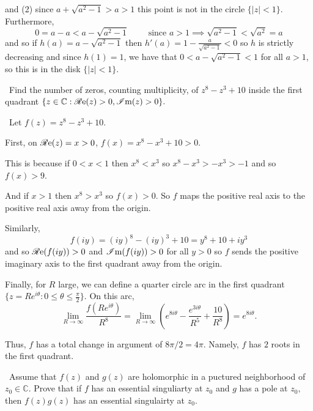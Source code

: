 \documentclass[12pt]{Qual}
\begin{document}
\begin{solution}
and (2) since $a+\sqrt{a^2-1}>a>1$ this point is not in the circle $\{|z|<1\}$. Furthermore, $$0=a-a<a-\sqrt{a^2-1}\qquad\text{ since }a>1\implies \sqrt{a^2-1}<\sqrt{a^2}=a$$ and so if $h(a)=a-\sqrt{a^2-1}$ then $h'(a)=1-\frac{a}{\sqrt{a^2-1}}<0$ so $h$ is strictly decreasing and since $h(1)=1$, we have that $0<a-\sqrt{a^2-1}<1$ for all $a>1$, so this is in the disk $\{|z|<1\}.$

\end{solution}
\newpage



\begin{problem} $\,$
Find the number of zeros, counting multiplicity, of $z^8-z^3+10$ inside the first quadrant $\{z\in\mathbb{C}:\mathscr{R}\text{e}(z)>0,\mathscr{I}\text{m}(z)>0\}.$
\end{problem}

\begin{solution}$\,$
Let $f(z)=z^8-z^3+10$.

First, on $\mathscr{R}\text{e}(z)=x>0$, $f(x)=x^8-x^3+10>0$.

This is because if $0<x<1$ then $x^8<x^3$ so $x^8-x^3>-x^3>-1$ and so $f(x)>9$.

And if $x>1$ then $x^8>x^3$ so $f(x)>0$. So $f$ maps the positive real axis to the positive real axis away from the origin.

Similarly, $$f(iy)=(iy)^8-(iy)^3+10=y^8+10+iy^3$$ and so $\mathscr{R}\text{e}(f(iy))>0$ and $\mathscr{I}\text{m}(f(iy))>0$ for all $y>0$ so $f$ sends the positive imaginary axis to the first quadrant away from the origin.

Finally, for $R$ large, we can define a quarter circle arc in the first quadrant $\{z=Re^{i\theta}:0\le\theta\le\frac{\pi}{2}\}$. On this arc, $$\lim_{R\to\infty}\frac{f(Re^{i\theta})}{R^8}=\lim_{R\to\infty}\left(e^{8i\theta}-\frac{e^{3i\theta}}{R^5}+\frac{10}{R^8}\right)=e^{8i\theta}.$$

Thus, $f$ has a total change in argument of $8\pi/2=4\pi.$ Namely, $f$ has $2$ roots in the first quadrant.
\end{solution}
\newpage




\begin{problem} $\,$
Assume that $f(z)$ and $g(z)$ are holomorphic in a puctured neighborhood of $z_0\in\mathbb{C}$. Prove that if $f$ has an essential singuliarty at $z_0$ and $g$ has a pole at $z_0,$ then $f(z)g(z)$ has an essential singulairty at $z_0.$
\end{problem}
\end{document}
